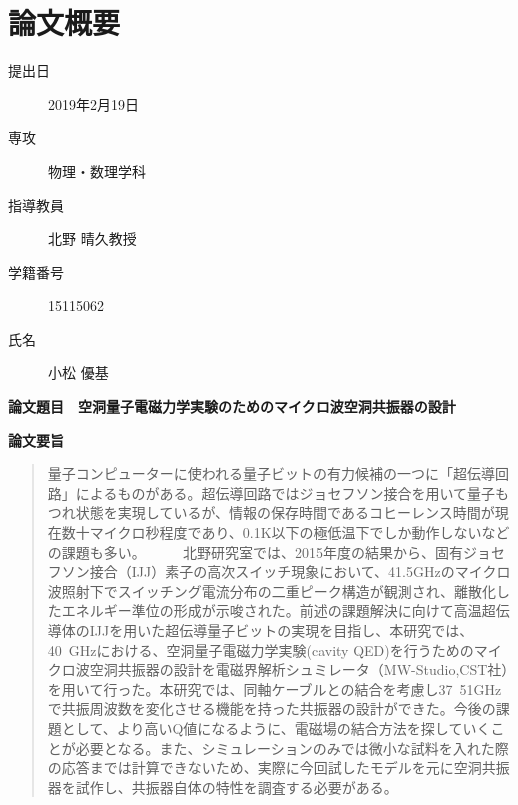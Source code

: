 \chapter*{論文概要}
\thispagestyle{empty}

\begin{description}
  \item[提出日] 2019年2月19日
  \item[専攻] 物理・数理学科
  \item[指導教員] 北野 晴久教授
  \item[学籍番号] 15115062
  \item[氏名] 小松 優基
\end{description}
\textbf{論文題目}　\textbf{空洞量子電磁力学実験のためのマイクロ波空洞共振器の設計}\\
\thispagestyle{empty}

\textbf{論文要旨}

\begin{abstract}
量子コンピューターに使われる量子ビットの有力候補の一つに「超伝導回路」によるものがある。超伝導回路ではジョセフソン接合を用いて量子もつれ状態を実現しているが、情報の保存時間であるコヒーレンス時間が現在数十マイクロ秒程度であり、0.1K以下の極低温下でしか動作しないなどの課題も多い。
　
　北野研究室では、2015年度の結果から、固有ジョセフソン接合（IJJ）素子の高次スイッチ現象において、41.5GHzのマイクロ波照射下でスイッチング電流分布の二重ピーク構造が観測され、離散化したエネルギー準位の形成が示唆された。前述の課題解決に向けて高温超伝導体のIJJを用いた超伝導量子ビットの実現を目指し、本研究では、40~GHzにおける、空洞量子電磁力学実験(cavity QED)を行うためのマイクロ波空洞共振器の設計を電磁界解析シュミレータ（MW-Studio,CST社）を用いて行った。本研究では、同軸ケーブルとの結合を考慮し37~51GHzで共振周波数を変化させる機能を持った共振器の設計ができた。今後の課題として、より高いQ値になるように、電磁場の結合方法を探していくことが必要となる。また、シミュレーションのみでは微小な試料を入れた際の応答までは計算できないため、実際に今回試したモデルを元に空洞共振器を試作し、共振器自体の特性を調査する必要がある。
\end{abstract}

